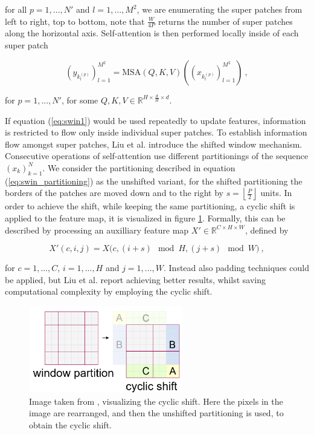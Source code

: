 for all $p = 1, ..., N'$ and $l = 1, ..., M^2$, 
we are enumerating the super patches from left to right, top to bottom, 
note that $\frac{W}{4P}$ returns the number of super patches along the horizontal axis.
Self-attention is then performed locally inside of each super patch

    \begin{equation} \label{eq:swin1}
        (y_{k^{(p)}_l})_{l=1}^{M^2} = \text{MSA}(Q, K, V) \left( (x_{k^{(p)}_l})_{l=1}^{M^2} \right) ~,
    \end{equation}

for $p = 1, ..., N'$, for some $Q, K, V \in \mathbb R^{H \times \frac{d}{H} \times d}$.

If equation (\ref{eq:swin1}) would be used repeatedly to update features,
information is restricted to flow only inside individual super patches. 
To establish information flow amongst super patches, 
Liu et al. \cite{liuSwinTransformerHierarchical2021} introduce the shifted window mechanism.
Consecutive operations of self-attention use different partitionings of the sequence $(x_k)_{k=1}^N$.
We consider the partitioning described in equation (\ref{eq:swin_partitioning}) as the unshifted variant,
for the shifted partitioning the borders of the patches are moved down and to the right by $s = \left \lfloor \frac{P}{2} \right \rfloor$ units.
In order to achieve the shift, while keeping the same partitioning, a cyclic shift is applied to the feature map,
it is visualized in figure \ref{fig:cyclic_shift}. Formally, this can be described by processing an auxilliary feature map $X' \in \mathbb R^{C \times H \times W}$,
defined by

    \begin{equation} \label{eq:cyclic_shift}
        X'(c, i, j) = X \big(c, (i + s) \mod H , (j + s) \mod W \big) ~,
    \end{equation}

for $c = 1, ..., C$, $i = 1, ..., H$ and $j = 1, ..., W$.
Instead also padding techniques could be applied,
but Liu et al. \cite{liuSwinTransformerHierarchical2021} report achieving better results, 
whilst saving computational complexity by employing the cyclic shift.

\begin{figure}[h!]
    \begin{center}
        \includegraphics[width=0.6\textwidth]{models/preliminaries/imgs/cyclic-shift.png}
    \end{center}
    \caption{Image taken from \cite{liuSwinTransformerHierarchical2021}, visualizing the cyclic shift.
        Here the pixels in the image are rearranged, and then the unshifted partitioning is used, to obtain the cyclic shift.}
    \label{fig:cyclic_shift}
\end{figure}

